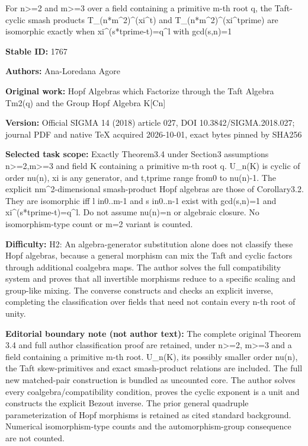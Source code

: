 \documentclass[11pt]{article}
\numberwithin{equation}{section}
\begin{document}
\begin{center}\Large For n>=2 and m>=3 over a field containing a primitive m-th root q, the Taft-cyclic smash products T\_(n*m\textasciicircum{}2)\textasciicircum{}(xi\textasciicircum{}t) and T\_(n*m\textasciicircum{}2)\textasciicircum{}(xi\textasciicircum{}tprime) are isomorphic exactly when xi\textasciicircum{}(s*tprime-t)=q\textasciicircum{}l with gcd(s,n)=1\end{center}
\noindent\textbf{Stable ID:} 1767\par
\noindent\textbf{Authors:} Ana-Loredana Agore\par
\noindent\textbf{Original work:} Hopf Algebras which Factorize through the Taft Algebra Tm2(q) and the Group Hopf Algebra K[Cn]\par
\noindent\textbf{Version:} Official SIGMA 14 (2018) article 027, DOI 10.3842/SIGMA.2018.027; journal PDF and native TeX acquired 2026-10-01, exact bytes pinned by SHA256\par
\noindent\textbf{Selected task scope:} Exactly Theorem3.4 under Section3 assumptions n>=2,m>=3 and field K containing a primitive m-th root q. U\_n(K) is cyclic of order nu(n), xi is any generator, and t,tprime range from0 to nu(n)-1. The explicit nm\textasciicircum{}2-dimensional smash-product Hopf algebras are those of Corollary3.2. They are isomorphic iff l in0..m-1 and s in0..n-1 exist with gcd(s,n)=1 and xi\textasciicircum{}(s*tprime-t)=q\textasciicircum{}l. Do not assume nu(n)=n or algebraic closure. No isomorphism-type count or m=2 variant is counted.\par
\noindent\textbf{Difficulty:} H2: An algebra-generator substitution alone does not classify these Hopf algebras, because a general morphism can mix the Taft and cyclic factors through additional coalgebra maps. The author solves the full compatibility system and proves that all invertible morphisms reduce to a specific scaling and group-like mixing. The converse constructs and checks an explicit inverse, completing the classification over fields that need not contain every n-th root of unity.\par
\noindent\textbf{Editorial boundary note (not author text):} The complete original Theorem 3.4 and full author classification proof are retained, under n>=2, m>=3 and a field containing a primitive m-th root. U\_n(K), its possibly smaller order nu(n), the Taft skew-primitives and exact smash-product relations are included. The full new matched-pair construction is bundled as uncounted core. The author solves every coalgebra/compatibility condition, proves the cyclic exponent is a unit and constructs the explicit Bezout inverse. The prior general quadruple parameterization of Hopf morphisms is retained as cited standard background. Numerical isomorphism-type counts and the automorphism-group consequence are not counted.\par
\end{document}
